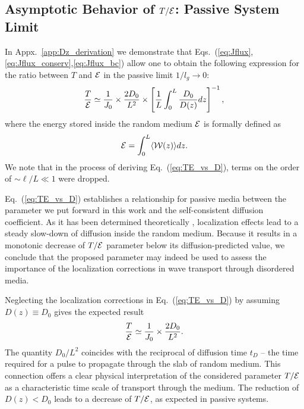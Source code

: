 \subsection{Asymptotic Behavior of \texorpdfstring{$T/{\cal E}$}{T/E}: Passive System Limit}
\label{sec:diffusion_zero_gain}

In Appx.~\ref{app:Dz_derivation} we demonstrate that Eqs.~(\ref{eq:Jflux},\ref{eq:Jflux_conserv},\ref{eq:Jflux_bc}) allow one to obtain the following expression for the ratio between $T$ and ${\cal E}$ in the passive limit $1/l_g\rightarrow 0$:
\begin{equation}
\displaystyle\frac{T}{{\cal E}}\simeq
\displaystyle\frac{1}{J_0} \times
\displaystyle\frac{2D_0}{L^2} \times
\left[
\displaystyle\frac{1}{L}\displaystyle\int_{0}^{L}\displaystyle\frac{D_0}{D(z)}dz
\right]^{-1},
\label{eq:TE_vs_D}
\end{equation}
where the energy stored inside the random medium ${\cal E}$ is formally defined as
\begin{equation}
{\cal E}=\int_0^L\langle {\cal W}(z)\rangle dz.
\label{eq:Energy_definition}
\end{equation}
We note that in the process of deriving Eq.~(\ref{eq:TE_vs_D}), terms on the order of $\sim\ell/L\ll 1$ were dropped.

Eq.~(\ref{eq:TE_vs_D}) establishes a relationship for passive media between the parameter we put forward in this work and the self-consistent diffusion coefficient. As it has been determined theoretically \cite{1980_Vollhardt_Wolfle,2008_Cherroret}, localization effects lead to a steady slow-down of diffusion inside the random medium. Because it results in a monotonic decrease of $T/{\cal E}$ parameter below its diffusion-predicted value, we conclude that the proposed parameter may indeed be used to assess the importance of the localization corrections in wave transport through disordered media.

Neglecting the localization corrections in Eq.~(\ref{eq:TE_vs_D}) by assuming $D(z)\equiv D_0$ gives the expected result
\begin{equation}
\displaystyle\frac{T}{{\cal E}}\simeq
\displaystyle\frac{1}{J_0} \times
\displaystyle\frac{2D_0}{L^2}.
\label{eq:TE_vs_D_simple}
\end{equation}
The quantity $D_0/L^2$ coincides with the reciprocal of diffusion time $t_D$ -- the time required for a pulse to propagate through the slab of random medium. This connection offers a clear physical interpretation of the considered parameter $T/{\cal E}$ as a characteristic time scale of transport through the medium. The reduction of $D(z)<D_0$ leads to a decrease of $T/{\cal E}$, as expected in passive systems.

